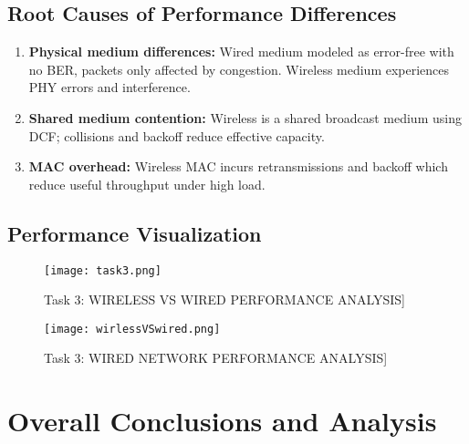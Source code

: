 \documentclass{article}
\begin{document}
\subsection{Root Causes of Performance Differences}

\begin{enumerate}

  \item \textbf{Physical medium differences:} Wired medium modeled as error-free with no BER, packets only affected by congestion. Wireless medium experiences PHY errors and interference.

  \item \textbf{Shared medium contention:} Wireless is a shared broadcast medium using DCF; collisions and backoff reduce effective capacity.

  \item \textbf{MAC overhead:} Wireless MAC incurs retransmissions and backoff which reduce useful throughput under high load.

\end{enumerate}

\subsection{Performance Visualization}

\begin{figure}[H]

  \centering

  \texttt{[image: task3.png]}

  \caption{Task 3: WIRELESS VS WIRED PERFORMANCE ANALYSIS]}

  

\end{figure}

\begin{figure}[H]

  \centering

  \texttt{[image: wirlessVSwired.png]}

  \caption{Task 3: WIRED NETWORK PERFORMANCE ANALYSIS]}

  

\end{figure}

\newpage

\section{Overall Conclusions and Analysis}
\end{document}
